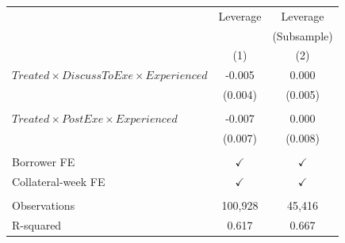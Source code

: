 \begin{table}[ht!]
\begin{tabular*}{\linewidth}{@{\extracolsep{\fill}}lcc }
     \toprule
          & Leverage & Leverage \\
          &       & (Subsample) \\
          & (1)   & (2) \\
\cmidrule{2-3}    $Treated \times DiscussToExe\times Experienced$ & -0.005 & 0.000 \\
          & (0.004) & (0.005) \\
          &       &  \\
     $Treated \times PostExe \times Experienced$  & -0.007 & 0.000 \\
          & (0.007) & (0.008) \\
          &       &  \\
    Borrower FE &   $\checkmark$       &  $\checkmark$  \\
    Collateral-week FE &    $\checkmark$      &  $\checkmark$   \\
          &       &  \\
    Observations & 100,928 & 45,416 \\
    R-squared & 0.617 & 0.667 \\
    \bottomrule
          \end{tabular*} 



\end{table}%

\clearpage
\newpage


%